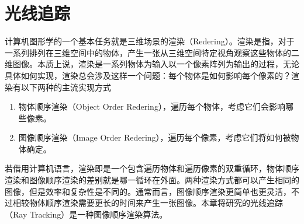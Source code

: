 \chapter{光线追踪}

计算机图形学的一个基本任务就是三维场景的渲染（Redering）。渲染是指，对于一系列排列在三维空间中的物体，产生一张从三维空间特定视角观察这些物体的二维图像。本质上说，渲染是一系列物体为输入以一个像素阵列为输出的过程，无论具体如何实现，渲染总会涉及这样一个问题：每个物体是如何影响每个像素的？渲染有以下两种的主流实现方式
\begin{enumerate}
    \item 物体顺序渲染（Object Order Redering），遍历每个物体，考虑它们会影响哪些像素。
    \item 图像顺序渲染（Image Order Redering），遍历每个像素，考虑它们将如何被物体确定。
\end{enumerate}
若借用计算机语言，渲染即是一个包含遍历物体和遍历像素的双重循环，物体顺序渲染和图像顺序渲染的差别就是哪一循环在外面。两种渲染方式都可以产生相同的图像，但是效率和复杂性是不同的。通常而言，图像顺序渲染更简单也更灵活，不过相较物体顺序渲染需要更长的时间来产生一张图像。本章将研究的光线追踪（Ray Tracking）是一种图像顺序渲染算法。




